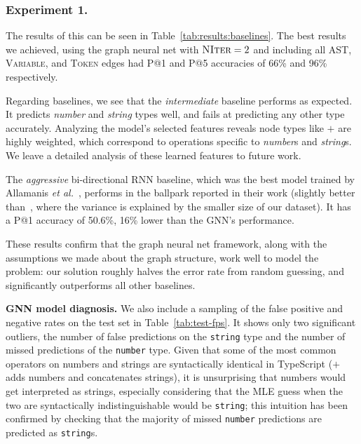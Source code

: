 \subsubsection{Experiment 1.}
The results of this can be seen in Table~\ref{tab:results:baselines}.
The best results we achieved, using the graph neural net with $\textsc{NIter}=2$ and including all AST, \textsc{Variable}, and \textsc{Token} edges had P@1 and P@5 accuracies of 66\% and 96\% respectively.

Regarding baselines, we see that the \textit{intermediate} baseline performs as expected.
It predicts \textit{number} and \textit{string} types well, and fails at predicting any other type accurately.
Analyzing the model's selected features reveals node types like $+$ are highly weighted, which correspond to operations specific to \textit{number}s and \textit{string}s.
We leave a detailed analysis of these learned features to future work.

The \textit{aggressive} bi-directional RNN baseline, which was the best model trained by Allamanis \textit{et al.}~\cite{hellendoorn2018deep}, performs in the ballpark reported in their work (slightly better than~\cite{hellendoorn2018deep}, where the variance is explained by the smaller size of our dataset).
It has a P@1 accuracy of 50.6\%, 16\% lower than the GNN's performance.

These results confirm that the graph neural net framework, along with the assumptions we made about the graph structure, work well to model the problem: our solution roughly halves the error rate from random guessing, and significantly outperforms all other baselines.

\textbf{GNN model diagnosis.}
We also include a sampling of the false positive and negative rates on the test set in Table~\ref{tab:test-fps}.
It shows only two significant outliers, the number of false predictions on the \texttt{string} type and the number of missed predictions of the \texttt{number} type.
Given that some of the most common operators on numbers and strings are syntactically identical in TypeScript ($+$ adds numbers and concatenates strings), it is unsurprising that numbers would get interpreted as strings, especially considering that the MLE guess when the two are syntactically indistinguishable would be \texttt{string}; this intuition has been confirmed by checking that the majority of missed \texttt{number} predictions are predicted as \texttt{string}s.

